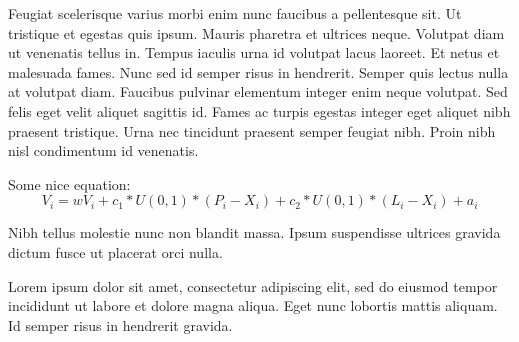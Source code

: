 {
    Feugiat scelerisque varius morbi enim nunc faucibus a pellentesque sit. Ut tristique et egestas quis ipsum. Mauris pharetra et ultrices neque. Volutpat diam ut venenatis tellus in. Tempus iaculis urna id volutpat lacus laoreet. Et netus et malesuada fames. Nunc sed id semper risus in hendrerit. Semper quis lectus nulla at volutpat diam. Faucibus pulvinar elementum integer enim neque volutpat. Sed felis eget velit aliquet sagittis id. Fames ac turpis egestas integer eget aliquet nibh praesent tristique. Urna nec tincidunt praesent semper feugiat nibh. Proin nibh nisl condimentum id venenatis\cite{C01}.
    
    \vspace{5pt}
    Some nice equation:
    \vspace{5pt}
    \begin{equation} 
        V_{i} = wV_{i} + c_{1} * U(0,1) * (P_{i} - X_{i}) + c_{2} * U(0,1) * (L_{i} - X_{i}) + a_{i} \label{eqn:velocityChargedUpdate} 
    \end{equation} 
}

{
    Nibh tellus molestie nunc non blandit massa. Ipsum suspendisse ultrices gravida dictum fusce ut placerat orci nulla.\\
    
    
}

{
\setlength{\columnsep}{30pt}
\begin{multicols*}{2}
{
    Lorem ipsum dolor sit amet, consectetur adipiscing elit, sed do eiusmod tempor incididunt ut labore et dolore magna aliqua. Eget nunc lobortis mattis aliquam. Id semper risus in hendrerit gravida.
}
{
}
\end{multicols*}
}